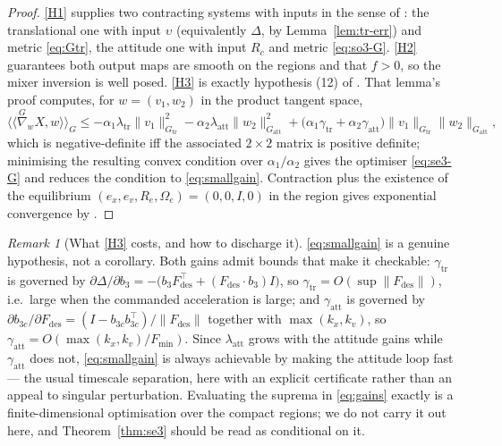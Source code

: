 \documentclass[11pt,a4paper]{article}
\newcommand{\ip}[2]{\langle\!\langle #1 , #2 \rangle\!\rangle}
\newcommand{\norm}[1]{\lVert #1 \rVert}
\newcommand{\Ome}{\Omega_{\!e}}
\theoremstyle{plain}
\theoremstyle{definition}
\theoremstyle{remark}
\newtheorem{remark}[theorem]{Remark}
\begin{document}
\begin{proof}
\ref{H1} supplies two contracting systems with inputs in the sense of
\cite[\S3]{SB13}: the translational one with input $\upsilon$ (equivalently
$\Delta$, by Lemma~\ref{lem:tr-err}) and metric \eqref{eq:Gtr}, the attitude one
with input $R_c$ and metric \eqref{eq:so3-G}. \ref{H2} guarantees both output maps
are smooth on the regions and that $f>0$, so the mixer inversion is well posed.
\ref{H3} is exactly hypothesis (12) of \cite[Lem.~3.2]{SB13}. That lemma's proof
computes, for $w = (v_1,w_2)$ in the product tangent space,
\[
  \ip{\overset{G}{\nabla}_{w}X}{w}_{G}
  \le -\alpha_1\lambda_{\mathrm{tr}}\norm{v_1}^2_{G_{\mathrm{tr}}}
      -\alpha_2\lambda_{\mathrm{att}}\norm{w_2}^2_{G_{\mathrm{att}}}
      +\big(\alpha_1\gamma_{\mathrm{tr}}+\alpha_2\gamma_{\mathrm{att}}\big)
        \norm{v_1}_{G_{\mathrm{tr}}}\norm{w_2}_{G_{\mathrm{att}}},
\]
which is negative-definite iff the associated $2\times2$ matrix is positive
definite; minimising the resulting convex condition over $\alpha_1/\alpha_2$ gives
the optimiser \eqref{eq:se3-G} and reduces the condition to \eqref{eq:smallgain}.
Contraction plus the existence of the equilibrium $(e_x,e_v,R_e,\Ome)=(0,0,I,0)$
in the region gives exponential convergence by \cite[Prop.~2.5(i)]{SB13}.
\end{proof}

\begin{remark}[What \ref{H3} costs, and how to discharge it]
\label{rem:gains}
\eqref{eq:smallgain} is a genuine hypothesis, not a corollary. Both gains admit
bounds that make it checkable:
$\gamma_{\mathrm{tr}}$ is governed by
$\partial\Delta/\partial b_3 = -\big(b_3F_{\mathrm{des}}^{\top} + (F_{\mathrm{des}}\cdot b_3)I\big)$,
so $\gamma_{\mathrm{tr}} = O(\sup\norm{F_{\mathrm{des}}})$, i.e.\ large when the
commanded acceleration is large; and $\gamma_{\mathrm{att}}$ is governed by
$\partial b_{3c}/\partial F_{\mathrm{des}} = (I - b_{3c}b_{3c}^{\top})/\norm{F_{\mathrm{des}}}$
together with $\max(k_x,k_v)$, so $\gamma_{\mathrm{att}} = O(\max(k_x,k_v)/F_{\min})$.
Since $\lambda_{\mathrm{att}}$ grows with the attitude gains while
$\gamma_{\mathrm{att}}$ does not, \eqref{eq:smallgain} is always achievable by
making the attitude loop fast --- the usual timescale separation, here with an
explicit certificate rather than an appeal to singular perturbation. Evaluating
the suprema in \eqref{eq:gains} exactly is a finite-dimensional optimisation over
the compact regions; we do not carry it out here, and Theorem~\ref{thm:se3} should
be read as conditional on it.
\end{remark}
\end{document}
